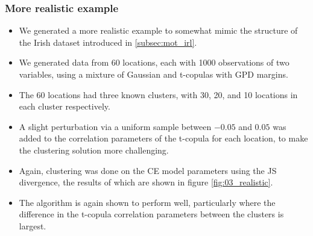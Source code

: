 \documentclass{article}
\numberwithin{equation}{section}
\begin{document}
\subsubsection{More realistic example} \label{subsubsec:sim_realistic}


\begin{itemize}
  \item We generated a more realistic example to somewhat mimic the structure of the Irish dataset introduced in \ref{subsec:mot_irl}.
  \item We generated data from 60 locations, each with 1000 observations of two variables, using a mixture of Gaussian and t-copulas with GPD margins.
  \item The 60 locations had three known clusters, with 30, 20, and 10 locations in each cluster respectively.
  \item A slight perturbation via a uniform sample between $-0.05$ and $0.05$ was added to the correlation parameters of the t-copula for each location, to make the clustering solution more challenging.
  \item Again, clustering was done on the CE model parameters using the JS divergence, the results of which are shown in figure \ref{fig:03_realistic}.
  \item The algorithm is again shown to perform well, particularly where the difference in the t-copula correlation parameters between the clusters is largest. 
\end{itemize}
\end{document}
